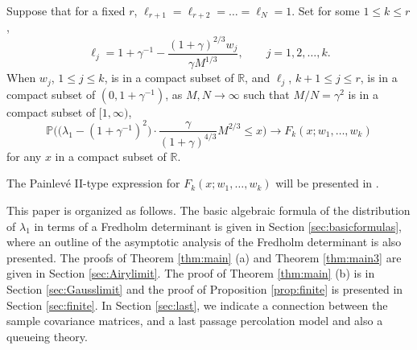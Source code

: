 \documentclass[11pt]{article}
\begin{document}
\begin{theo}\label{thm:main3}
Suppose that for a fixed $r$, $\ell_{r+1}=\ell_{r+2}=\dots
=\ell_N=1$. Set for some $1\le k\le r$,
\begin{equation}
  \ell_j = 1+\gamma^{-1} - \frac{(1+\gamma)^{2/3}w_j}{\gamma M^{1/3}},
  \qquad j=1,2,\dots, k.
\end{equation}
When $w_j$, $1\le j\le k$, is in a compact subset of $\mathbb{R}$,
and $\ell_{j}$, $k+1\le j\le r$, is in a compact subset of
$(0,1+\gamma^{-1})$, as $M, N\to\infty$ such that $M/N=\gamma^2$
is in a compact subset of $[1,\infty)$,
\begin{equation}\label{eq:main3}
\mathbb{P} \biggl( \bigr( \lambda_1 - (1+\gamma^{-1})^2 \bigr)
\cdot
  \frac{\gamma}{(1+\gamma)^{4/3}}M^{2/3} \le x \biggr)
  \to F_k(x;w_1,\dots, w_k)
\end{equation}
for any $x$ in a compact subset of $\mathbb{R}$.
\end{theo}

The Painlev\'e II-type expression for $F_k(x;w_1,\dots, w_k)$
will be presented in \cite{Baik}.




\bigskip



This paper is organized as follows. The basic algebraic formula of
the distribution of $\lambda_1$ in terms of a Fredholm determinant
is given in Section \ref{sec:basicformulas}, where an outline of
the asymptotic analysis of the Fredholm determinant is also
presented. The proofs of Theorem \ref{thm:main} (a) and Theorem
\ref{thm:main3} are given in Section \ref{sec:Airylimit}. The
proof of Theorem \ref{thm:main} (b) is in Section
\ref{sec:Gausslimit} and the proof of Proposition
\ref{prop:finite} is presented in Section \ref{sec:finite}. In
Section \ref{sec:last}, we indicate a connection between the
sample covariance matrices, and a last passage percolation model
and also a queueing theory.
\end{document}
